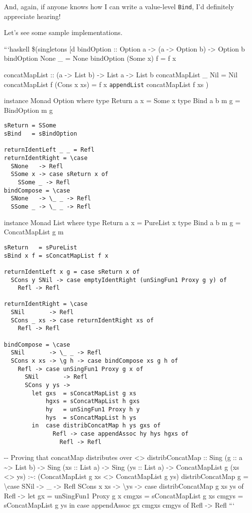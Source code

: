 \documentclass[]{article}
\begin{document}
And, again, if anyone knows how I can write a value-level \texttt{Bind}, I'd
definitely appreciate hearing!

Let's see some sample implementations.

```haskell \$(singletons {[}d\textbar{} bindOption :: Option a -\textgreater{}
(a -\textgreater{} Option b) -\textgreater{} Option b bindOption None \_ = None
bindOption (Some x) f = f x

concatMapList :: (a -\textgreater{} List b) -\textgreater{} List a
-\textgreater{} List b concatMapList \_ Nil = Nil concatMapList f (Cons x xs) =
f x \texttt{appendList} concatMapList f xs \textbar{}{]})

instance Monad Option where type Return a x = Some x type Bind a b m g =
BindOption m g

\begin{verbatim}
sReturn = SSome
sBind   = sBindOption

returnIdentLeft _ _ = Refl
returnIdentRight = \case
  SNone   -> Refl
  SSome x -> case sReturn x of
    SSome _ -> Refl
bindCompose = \case
  SNone   -> \_ _ -> Refl
  SSome _ -> \_ _ -> Refl
\end{verbatim}

instance Monad List where type Return a x = PureList x type Bind a b m g =
ConcatMapList g m

\begin{verbatim}
sReturn   = sPureList
sBind x f = sConcatMapList f x

returnIdentLeft x g = case sReturn x of
  SCons y SNil -> case emptyIdentRight (unSingFun1 Proxy g y) of
    Refl -> Refl

returnIdentRight = \case
  SNil       -> Refl
  SCons _ xs -> case returnIdentRight xs of
    Refl -> Refl

bindCompose = \case
  SNil       -> \_ _ -> Refl
  SCons x xs -> \g h -> case bindCompose xs g h of
    Refl -> case unSingFun1 Proxy g x of
      SNil       -> Refl
      SCons y ys ->
        let gxs  = sConcatMapList g xs
            hgxs = sConcatMapList h gxs
            hy   = unSingFun1 Proxy h y
            hys  = sConcatMapList h ys
        in  case distribConcatMap h ys gxs of
              Refl -> case appendAssoc hy hys hgxs of
                Refl -> Refl
\end{verbatim}

-\/- \textbar{} Proving that concatMap distributes over
\textless{}\textgreater{} distribConcatMap :: Sing (g :: a
\textasciitilde{}\textgreater{} List b) -\textgreater{} Sing (xs :: List a)
-\textgreater{} Sing (ys :: List a) -\textgreater{} ConcatMapList g (xs
\textless{}\textgreater{} ys) :\textasciitilde{}: (ConcatMapList g xs
\textless{}\textgreater{} ConcatMapList g ys) distribConcatMap g =
\textbackslash{}case SNil -\textgreater{} \_ -\textgreater{} Refl SCons x xs
-\textgreater{} \textbackslash{}ys -\textgreater{} case distribConcatMap g xs ys
of Refl -\textgreater{} let gx = unSingFun1 Proxy g x cmgxs = sConcatMapList g
xs cmgys = sConcatMapList g ys in case appendAssoc gx cmgxs cmgys of Refl
-\textgreater{} Refl ```
\end{document}
